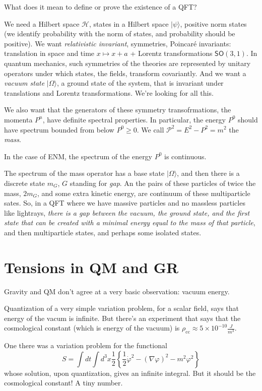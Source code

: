 \documentclass{book}
\begin{document}
{What does it mean to define or prove the
existence of a QFT?

We need a Hilbert space $\mathcal{H}$, states
in a Hilbert space $|\psi\rangle$,
positive norm states (we identify probability
with the norm of states, and
probability should be positive). We want {\it
relativistic invariant},
symmetries, Poincaré invariants: translation
in space and time $x \mapsto x+a$ +
Lorentz transformations $\mathsf{SO}(3,1)$.
In quantum mechanics, such
symmetries of the theories are represented by
unitary operators under which
states, the fields, transform covariantly.
And we want a {\it vacuum
state} $|\Omega\rangle$, a ground state of
the system, that is invariant under
translations and Lorentz transformations.
We're looking for all this.

We also want that the generators of these
symmetry transofrmations, the momenta
$P^n$, have definite spectral properties. In
particular, the energy $P^0$ should
have spectrum bounded from below $P^0\geq 0$.
We call
$\mathcal{P}^2=E^2-P^2=m^2$ the {\it mass}.

In the case of ENM, the spectrum of the
energy  $P^0$ is continuous.

The spectrum of the mass operator has a base
state $|\Omega\rangle$, and then
there is a discrete state $m_G$, $G$ standing
for \textit{gap}. An the pairs of
these particles of twice the mass, $2m_G$,
and some extra kinetic energy, are
continuum of these multiparticle sates. So,
in a QFT where we have massive
particles and no massless particles like
lightrays, \textit{there is a gap
between the vacuum, the ground state, and the
first state that can be created
with a minimal energy equal to the mass of
that particle}, and then
multiparticle states, and perhaps some
isolated states.

\section{Tensions in QM and GR}
\label{section-tensions}

Gravity and QM don't agree at a very basic
observation: vacuum energy.

Quantization of a very simple variation
problem, for a scalar field, says that
energy of the vacum is infinite. But there's
an experiment that says that the
cosmological constant (which is energy of the
vacuum) is
 $\rho_{\operatorname{cc}}\approx 5 \times
 10^{-10}\frac{J}{m^3}$.

One there was a variation problem for the
functional
$$
S=\int dt \int d^3x \frac{1}{2}\left\{
\frac{1}{2}\dot\varphi^2-(\nabla
\varphi)^2-m^2\varphi^2\right\}
$$
whose solution, upon quantization, gives an
infinite integral. But it should be
the cosmological constant! A tiny number.

}
\end{document}
